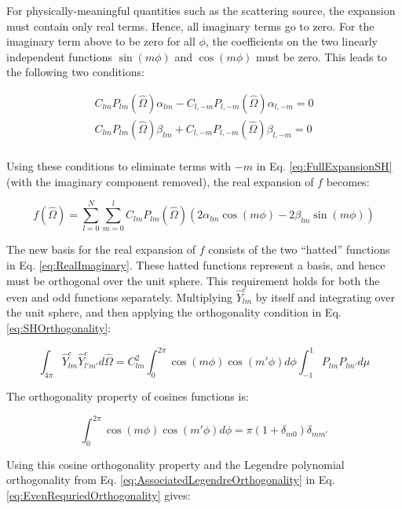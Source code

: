 \documentclass[10pt]{article}
\newcommand{\hO}{\hat{\Omega}}
\begin{document}
\begin{flushleft}
\begin{tcolorbox}[breakable]
For physically-meaningful quantities such as the scattering source, the expansion must contain only real terms. Hence, all imaginary terms go to zero. For the imaginary term above to be zero for all \(\phi\), the coefficients on the two linearly independent functions \(\sin{(m\phi)}\) and \(\cos{(m\phi)}\) must be zero. This leads to the following two conditions:

\begin{equation}
\begin{aligned}
C_{lm}P_{lm}(\hO  )\alpha_{lm}-C_{l,-m}P_{l,-m}(\hO  )\alpha_{l,-m}=0\\
C_{lm}P_{lm}(\hO  )\beta_{lm}+C_{l,-m}P_{l,-m}(\hO  )\beta_{l,-m}=0\\
\end{aligned}
\end{equation}

Using these conditions to eliminate terms with \(-m\) in Eq. \eqref{eq:FullExpansionSH} (with the imaginary component removed), the real expansion of \(f\) becomes:

\begin{equation}
\label{eq:FullExpansionSH2}
f(\hO  )=\sum_{l=0}^{N}\sum_{m=0}^{l}C_{lm}P_{lm}(\hO  )\left(2\alpha_{lm}\cos{(m\phi)}-2\beta_{lm}\sin{(m\phi)}\right)
\end{equation}

The new basis for the real expansion of \(f\) consists of the two ``hatted'' functions in Eq. \eqref{eq:RealImaginary}. These hatted functions represent a basis, and hence must be orthogonal over the unit sphere. This requirement holds for both the even and odd functions separately. Multiplying \(\hat{Y}_{lm}^e\) by itself and integrating over the unit sphere, and then applying the orthogonality condition in Eq. \eqref{eq:SHOrthogonality}:

\begin{equation}
\label{eq:EvenRequriedOrthogonality}
\int_{4\pi}^{}\hat{Y}_{lm}^e\hat{Y}_{l'm'}^ed\hO  =C_{lm}^2\int_{0}^{2\pi}\cos{(m\phi)}\cos{(m'\phi)}d\phi\int_{-1}^{1}P_{lm}P_{lm'}d\mu
\end{equation}

The orthogonality property of cosines functions is:

\begin{equation}
\int_{0}^{2\pi}\cos{(m\phi)}\cos{(m'\phi)}d\phi=\pi(1+\delta_{m0})\delta_{mm'}
\end{equation}

Using this cosine orthogonality property and the Legendre polynomial orthogonality from Eq. \eqref{eq:AssociatedLegendreOrthogonality} in Eq. \eqref{eq:EvenRequriedOrthogonality} gives:


\end{tcolorbox}
\end{flushleft}
\end{document}
